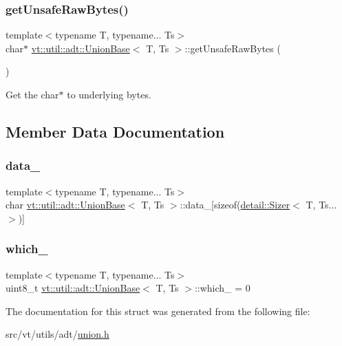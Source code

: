 \subsubsection{\texorpdfstring{get\+Unsafe\+Raw\+Bytes()}{getUnsafeRawBytes()}}
{\footnotesize\ttfamily template$<$typename T, typename... Ts$>$ \\
char$\ast$ \hyperlink{structvt_1_1util_1_1adt_1_1_union_base}{vt\+::util\+::adt\+::\+Union\+Base}$<$ T, Ts $>$\+::get\+Unsafe\+Raw\+Bytes (\begin{DoxyParamCaption}{ }\end{DoxyParamCaption})\hspace{0.3cm}{\ttfamily [inline]}}



Get the char$\ast$ to underlying bytes. 



\subsection{Member Data Documentation}
\mbox{\label{structvt_1_1util_1_1adt_1_1_union_base_a3badf6a022a698dc00937b3df621caf8}} 
\subsubsection{\texorpdfstring{data\+\_\+}{data\_}}
{\footnotesize\ttfamily template$<$typename T, typename... Ts$>$ \\
char \hyperlink{structvt_1_1util_1_1adt_1_1_union_base}{vt\+::util\+::adt\+::\+Union\+Base}$<$ T, Ts $>$\+::data\+\_\+\mbox{[}sizeof(\hyperlink{unionvt_1_1util_1_1adt_1_1detail_1_1_sizer}{detail\+::\+Sizer}$<$ T, Ts... $>$)\mbox{]}\hspace{0.3cm}{\ttfamily [protected]}}

\mbox{\label{structvt_1_1util_1_1adt_1_1_union_base_ae46ed3323e83507ef0b47ad82db493d0}} 
\subsubsection{\texorpdfstring{which\+\_\+}{which\_}}
{\footnotesize\ttfamily template$<$typename T, typename... Ts$>$ \\
uint8\+\_\+t \hyperlink{structvt_1_1util_1_1adt_1_1_union_base}{vt\+::util\+::adt\+::\+Union\+Base}$<$ T, Ts $>$\+::which\+\_\+ = 0\hspace{0.3cm}{\ttfamily [protected]}}



The documentation for this struct was generated from the following file\+:\begin{DoxyCompactItemize}
\item 
src/vt/utils/adt/\hyperlink{union_8h}{union.\+h}\end{DoxyCompactItemize}
